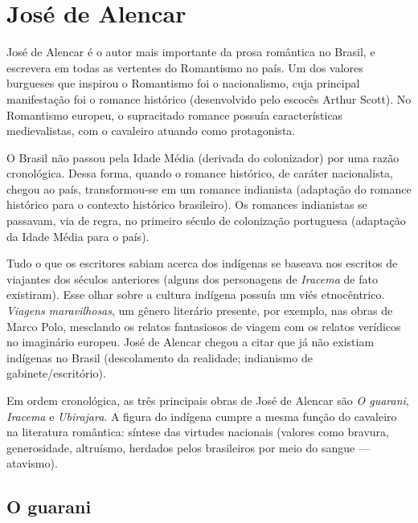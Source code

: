 \section{José de Alencar}

José de Alencar é o autor mais importante da prosa romântica no Brasil, e escrevera em todas as vertentes do Romantismo no país. Um dos valores burgueses que inspirou o Romantismo foi o nacionalismo, cuja principal manifestação foi o romance histórico (desenvolvido pelo escocês Arthur Scott). No Romantismo europeu, o supracitado romance possuía características medievalistas, com o cavaleiro atuando como protagonista.

O Brasil não passou pela Idade Média (derivada do colonizador) por uma razão cronológica. Dessa forma, quando o romance histórico, de caráter nacionalista, chegou ao país, transformou-se em um romance indianista (adaptação do romance histórico para o contexto histórico brasileiro). Os romances indianistas se passavam, via de regra, no primeiro século de colonização portuguesa (adaptação da Idade Média para o país).

Tudo o que os escritores sabiam acerca dos indígenas se baseava nos escritos de viajantes dos séculos anteriores (alguns dos personagens de \textit{Iracema} de fato existiram). Esse olhar sobre a cultura indígena possuía um viés etnocêntrico. \textit{Viagens maravilhosas}, um gênero literário presente, por exemplo, nas obras de Marco Polo, mesclando os relatos fantasiosos de viagem com os relatos verídicos no imaginário europeu. José de Alencar chegou a citar que já não existiam indígenas no Brasil (descolamento da realidade; indianismo de gabinete/escritório).

Em ordem cronológica, as três principais obras de José de Alencar são \textit{O guarani}, \textit{Iracema} e \textit{Ubirajara}. A figura do indígena cumpre a mesma função do cavaleiro na literatura romântica: síntese das virtudes nacionais (valores como bravura, generosidade, altruísmo, herdados pelos brasileiros por meio do sangue — atavismo).

\subsection{O guarani}

